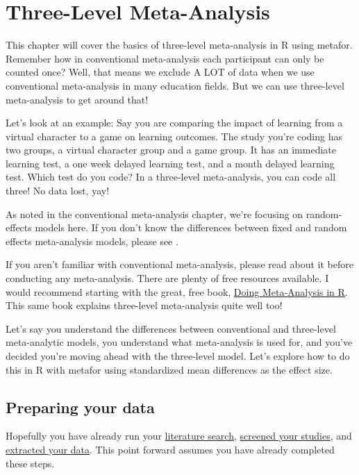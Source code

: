 \documentclass[
]{book}
\begin{document}
\hypertarget{3LMA}{%
\chapter{Three-Level Meta-Analysis}\label{3LMA}}

This chapter will cover the basics of three-level meta-analysis in R using metafor\citep{viechtbauer2010}. Remember how in conventional meta-analysis each participant can only be counted once? Well, that means we exclude A LOT of data when we use conventional meta-analysis in many education fields. But we can use three-level meta-analysis to get around that!

Let's look at an example: Say you are comparing the impact of learning from a virtual character to a game on learning outcomes. The study you're coding has two groups, a virtual character group and a game group. It has an immediate learning test, a one week delayed learning test, and a month delayed learning test. Which test do you code? In a three-level meta-analysis, you can code all three! No data lost, yay!

As noted in the conventional meta-analysis chapter, we're focusing on random-effects models here. If you don't know the differences between fixed and random effects meta-analysis models, please see \citep{borenstein2010}.

If you aren't familiar with conventional meta-analysis, please read about it before conducting any meta-analysis. There are plenty of free resources available. I would recommend starting with the great, free book, \href{https://bookdown.org/MathiasHarrer/Doing_Meta_Analysis_in_R/}{Doing Meta-Analysis in R}\citep{harrer2021}. This same book explains three-level meta-analysis quite well too!

Let's say you understand the differences between conventional and three-level meta-analytic models, you understand what meta-analysis is used for, and you've decided you're moving ahead with the three-level model. Let's explore how to do this in R with metafor using standardized mean differences as the effect size.

\hypertarget{preparing-your-data-1}{%
\section{Preparing your data}\label{preparing-your-data-1}}

Hopefully you have already run your \protect\hyperlink{literaturesearch}{literature search}, \protect\hyperlink{screening}{screened your studies}, and \protect\hyperlink{data}{extracted your data}. This point forward assumes you have already completed these steps.
\end{document}
